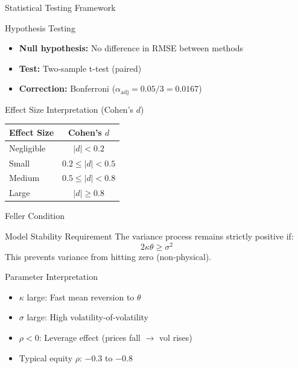 \documentclass{beamer}
\begin{document}
\begin{frame}{Statistical Testing Framework}
    \begin{block}{Hypothesis Testing}
        \begin{itemize}
            \item \textbf{Null hypothesis:} No difference in RMSE between methods
            \item \textbf{Test:} Two-sample t-test (paired)
            \item \textbf{Correction:} Bonferroni ($\alpha_{\text{adj}} = 0.05/3 = 0.0167$)
        \end{itemize}
    \end{block}

    \vspace{0.3cm}

    \begin{block}{Effect Size Interpretation (Cohen's $d$)}
        \centering
        \begin{tabular}{lc}
            \toprule
            \textbf{Effect Size} & \textbf{Cohen's $d$} \\
            \midrule
            Negligible & $|d| < 0.2$ \\
            Small & $0.2 \leq |d| < 0.5$ \\
            Medium & $0.5 \leq |d| < 0.8$ \\
            Large & $|d| \geq 0.8$ \\
            \bottomrule
        \end{tabular}
    \end{block}
\end{frame}

\begin{frame}{Feller Condition}
    \begin{block}{Model Stability Requirement}
        The variance process remains strictly positive if:
        \begin{equation}
            2\kappa\theta \geq \sigma^2
        \end{equation}
        This prevents variance from hitting zero (non-physical).
    \end{block}

    \vspace{0.3cm}

    \begin{block}{Parameter Interpretation}
        \begin{itemize}
            \item $\kappa$ large: Fast mean reversion to $\theta$
            \item $\sigma$ large: High volatility-of-volatility
            \item $\rho < 0$: Leverage effect (prices fall $\rightarrow$ vol rises)
            \item Typical equity $\rho$: $-0.3$ to $-0.8$
        \end{itemize}
    \end{block}
\end{frame}
\end{document}

